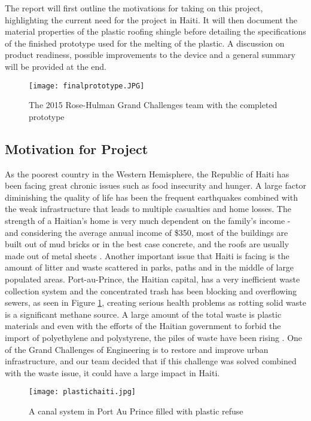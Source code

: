 \documentclass[11pt,english]{article}
\begin{document}
\noindent The report will first outline the motivations for taking on this project, highlighting the current need for the project in Haiti. It will then document the material properties of the plastic roofing shingle before detailing the specifications of the finished prototype used for the melting of the plastic. A discussion on product readiness, possible improvements to the device and a general summary will be provided at the end. 
\begin{figure}[ht!]
\centering
\texttt{[image: finalprototype.JPG]}
\caption{The 2015 Rose-Hulman Grand Challenges team with the completed prototype}
\end{figure}

\subsection{Motivation for Project}
As the poorest country in the Western Hemisphere, the Republic of Haiti has been facing great chronic issues such as food insecurity and hunger. A large factor diminishing the quality of life has been the frequent earthquakes combined with the weak infrastructure that leads to multiple casualties and home losses. The strength of a Haitian's home is very much dependent on the family's income - and considering the average annual income of \$350, most of the buildings are built out of mud bricks or in the best case concrete, and the roofs are usually made out of metal sheets \cite{income}. Another important issue that Haiti is facing is the amount of litter and waste scattered in parks, paths and in the middle of large populated areas. Port-au-Prince, the Haitian capital, has a very inefficient waste collection system and the concentrated trash has been blocking and overflowing sewers, as seen in Figure \ref{fig:bagspic}, creating serious health problems as rotting solid waste is a significant methane source. A large amount of the total waste is plastic materials and even with the efforts of the Haitian government to forbid the import of polyethylene and polystyrene, the piles of waste have been rising \cite{raymont2014}. One of the Grand Challenges of Engineering is to restore and improve urban infrastructure, and our team decided that if this challenge was solved combined with the waste issue, it could have a large impact in Haiti.

\begin{figure}[ht!]
\centering
\texttt{[image: plastichaiti.jpg]}
\caption{A canal system in Port Au Prince filled with plastic refuse \cite{bags}}
\label{fig:bagspic}
\end{figure}
\end{document}
